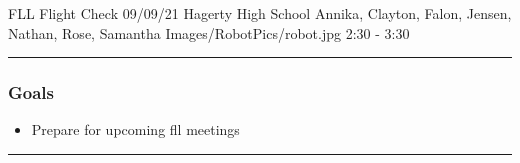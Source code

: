 \insertmeeting 
	{FLL Flight Check} 
	{09/09/21}
	{Hagerty High School}
	{Annika, Clayton, Falon, Jensen, Nathan, Rose, Samantha}
	{Images/RobotPics/robot.jpg}
	{2:30 - 3:30}
	
\noindent\hfil\rule{\textwidth}{.4pt}\hfil
\subsubsection*{Goals}
\begin{itemize}
    \item Prepare for upcoming fll meetings 

\end{itemize} 

\noindent\hfil\rule{\textwidth}{.4pt}\hfil

